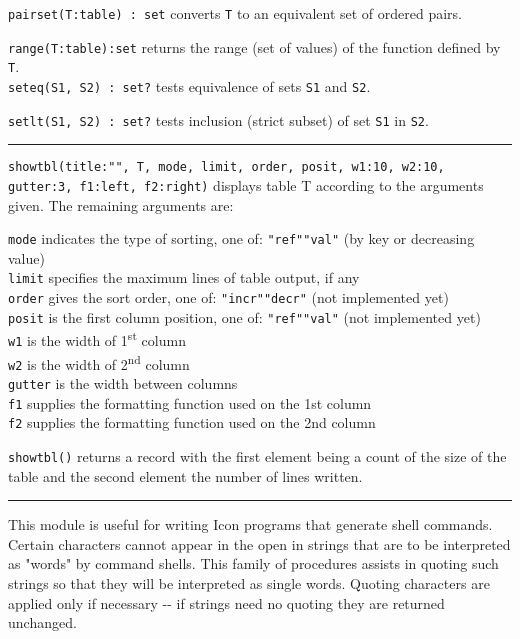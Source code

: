 \texttt{pairset(T:table) : set} converts \texttt{T} to an equivalent set
of ordered pairs.

\texttt{range(T:table):set} returns the range (set of values) of the
function defined by \texttt{T}.\\
\texttt{seteq(S1, S2) : set?} tests equivalence
of sets \texttt{S1} and \texttt{S2}.

\texttt{setlt(S1, S2) : set?} tests inclusion (strict subset) of set
\texttt{S1} in \texttt{S2}. 


\vspace{0.25cm}\hrule{}

\texttt{showtbl(title:"", T, mode, limit,
order, posit, w1:10, w2:10, gutter:3, f1:left, f2:right)} displays
table T according to the arguments given. The remaining arguments are:

\texttt{mode} indicates the type of sorting, one of:
\texttt{"ref"{\textbar}"val"}
(by key or decreasing value)\\
\texttt{limit} specifies the maximum lines of table output, if
any\\
\texttt{order} gives the sort order, one of:
\texttt{"incr"{\textbar}"decr"}
(not implemented yet)\\
\texttt{posit} is the first column position, one of:
\texttt{"ref"{\textbar}"val"}
(not implemented yet)\\
\texttt{w1} is the width of 1\textsuperscript{st} column\\
\texttt{w2} is the width of 2\textsuperscript{nd} column\\
\texttt{gutter} is the width between columns\\
\texttt{f1} supplies the formatting function used on the 1st
column\\
\texttt{f2} supplies the formatting function used on the 2nd column

\texttt{showtbl()} returns a record with the first element being a count
of the size of the table and the second element the number of lines
written. 

\vspace{0.25cm}\hrule{}

This module is useful for writing Icon programs that generate
shell commands. Certain characters cannot appear
in the open in strings that are to be interpreted as
"words" by command shells. This family of
procedures assists in quoting such strings so that they will be
interpreted as single words. Quoting characters are applied only if
necessary -{}- if strings need no quoting they are returned unchanged.


